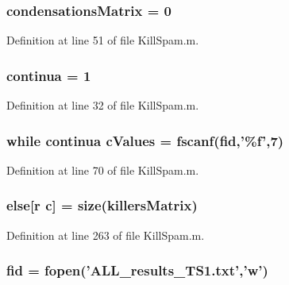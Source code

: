 \hypertarget{a00029_afaba8eef2f8f4e4dda2e893a19e55a94}{
\subsubsection[{condensations\+Matrix}]{\setlength{\rightskip}{0pt plus 5cm}condensations\+Matrix = 0}}\label{a00029_afaba8eef2f8f4e4dda2e893a19e55a94}


Definition at line 51 of file Kill\+Spam.\+m.

\hypertarget{a00029_a9c951ebd5bc3f1adce943bee1255f4d6}{
\subsubsection[{continua}]{\setlength{\rightskip}{0pt plus 5cm}continua = 1}}\label{a00029_a9c951ebd5bc3f1adce943bee1255f4d6}


Definition at line 32 of file Kill\+Spam.\+m.

\hypertarget{a00029_ad4ba7701967c1da20171228afccb7081}{
\subsubsection[{c\+Values}]{\setlength{\rightskip}{0pt plus 5cm}while {\bf continua} c\+Values = {\bf fscanf}({\bf fid},'\%{\bf f}',7)}}\label{a00029_ad4ba7701967c1da20171228afccb7081}


Definition at line 70 of file Kill\+Spam.\+m.

\hypertarget{a00029_af5946383720aa572eb93e1e63afc23c2}{
\subsubsection[{else}]{\setlength{\rightskip}{0pt plus 5cm}else\mbox{[}{\bf r} {\bf c}\mbox{]} = {\bf size}({\bf killers\+Matrix})}}\label{a00029_af5946383720aa572eb93e1e63afc23c2}


Definition at line 263 of file Kill\+Spam.\+m.

\hypertarget{a00029_ae9011d40c6f13e68e6f07156e0da7c5d}{
\subsubsection[{fid}]{\setlength{\rightskip}{0pt plus 5cm}fid = fopen('A\+L\+L\+\_\+results\+\_\+\+T\+S1.\+txt','w')}}\label{a00029_ae9011d40c6f13e68e6f07156e0da7c5d}


